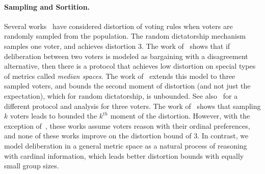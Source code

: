 \paragraph{Sampling and Sortition.} Several works~\cite{FainGMS17,FainGMP19,FainFM20,CaragiannisM024} have considered distortion of voting rules when voters are randomly sampled from the population. The random dictatorship mechanism samples one voter, and achieves distortion $3$. The work of~\cite{FainGMS17} shows that if deliberation between two voters is modeled as bargaining with a disagreement alternative, then there is a protocol that achieves low distortion on special types of metrics called {\em median spaces}. The work of~\cite{FainGMP19} extends this model to three sampled voters, and bounds the second moment of distortion (and not just the expectation), which for random dictatorship, is unbounded. See also~\cite{GoelLee} for a different protocol and analysis for three voters. The work of~\cite{FainFM20} shows that sampling $k$ voters leads to bounded the $k^{th}$ moment of the distortion. However, with the exception of~\cite{FainGMS17}, these works assume voters reason with their ordinal preferences, and none of these works improve on the distortion bound of $3$. In contrast, we model deliberation in a general metric space as a natural process of reasoning with cardinal information, which leads better distortion bounds with equally small group sizes.

